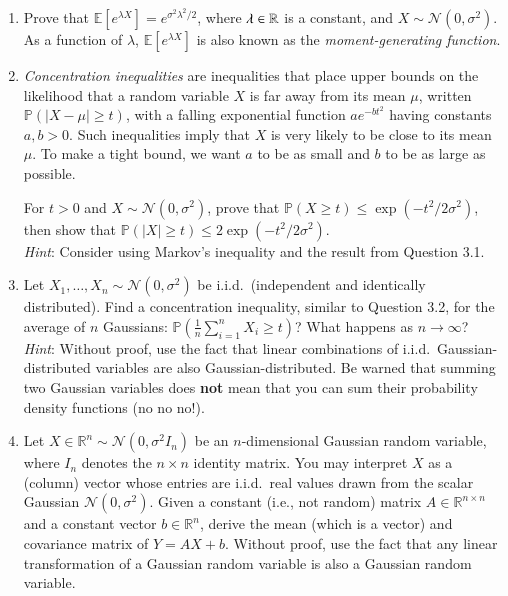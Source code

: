 \documentclass[11pt]{article}
\begin{document}
\begin{enumerate}
    \item Prove that $\mathbb{E}[e^{\lambda X}] = e^{\sigma^2\lambda^2/2}$, where $\lambda\in\mathbb{R}$ is a constant, and $X\sim \mathcal{N}(0,\sigma^2)$. As a function of $\lambda$, $\mathbb{E}[e^{\lambda X}]$ is also known as the \emph{moment-generating function}.
    
    
    
    \item 
    \emph{Concentration inequalities} are inequalities that place upper bounds on the likelihood that a random variable $X$ is far away from its mean $\mu$, written $\mathbb{P}(|X - \mu| \geq t)$, with a falling exponential function $a e^{-b t^2}$ having constants $a, b > 0$. Such inequalities imply that $X$ is very likely to be close to its mean $\mu$.  To make a tight bound, we want $a$ to be as small and $b$ to be as large as possible.
    
    For $t > 0$ and $X\sim \mathcal{N}(0,\sigma^2)$, prove that $\mathbb{P}(X\geq t)\leq \exp(-t^2/2\sigma^2)$, then show that $\mathbb{P}(|X|\geq t)\leq 2\exp(-t^2/2\sigma^2)$.\\
    \emph{Hint}: Consider using Markov's inequality and the result from Question 3.1.

    

    \item Let $X_1,\dots,X_n\sim \mathcal{N}(0,\sigma^2)$ be i.i.d.\ (independent and identically distributed). Find a concentration inequality, similar to Question 3.2, for the average of $n$ Gaussians: $\mathbb{P}(\frac{1}{n}\sum_{i=1}^n X_i\geq t)$? What happens as $n\rightarrow\infty$?\\
    \emph{Hint}: Without proof, use the fact that linear combinations of i.i.d.\ Gaussian-distributed variables are also Gaussian-distributed. Be warned that summing two Gaussian variables does {\bf not} mean that you can sum their probability density functions (no no no!).
    
    


    \item Let $X \in \mathbb{R}^n \sim \mathcal{N}(0,\sigma^2 I_n)$ be an $n$-dimensional Gaussian random variable, where $I_n$ denotes the $n \times n$ identity matrix. You may interpret $X$ as a (column) vector whose entries are i.i.d.\ real values drawn from the scalar Gaussian $\mathcal{N}(0,\sigma^2)$. Given a constant (i.e., not random) matrix $A \in \mathbb{R}^{n \times n}$ and a constant vector $b \in \mathbb{R}^n$, derive the mean (which is a vector) and covariance matrix of $Y = AX+b$. Without proof, use the fact that any linear transformation of a Gaussian random variable is also a Gaussian random variable. 
    

\end{enumerate}
\end{document}
